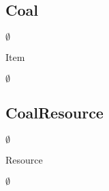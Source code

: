 \subsection{Coal}
\begin{class-template-responsibility}

\end{class-template-responsibility}
\begin{class-template-interface}
$\emptyset$
\end{class-template-interface}
\begin{class-template-baseclass}
Item
\end{class-template-baseclass}
\begin{class-template-attribute}
\item[] $\emptyset$
\end{class-template-attribute}
\begin{class-template-method}
\end{class-template-method}


\subsection{CoalResource}
\begin{class-template-responsibility}

\end{class-template-responsibility}
\begin{class-template-interface}
$\emptyset$
\end{class-template-interface}
\begin{class-template-baseclass}
Resource
\end{class-template-baseclass}
\begin{class-template-attribute}
\item[] $\emptyset$
\end{class-template-attribute}
\begin{class-template-method}
\end{class-template-method}


